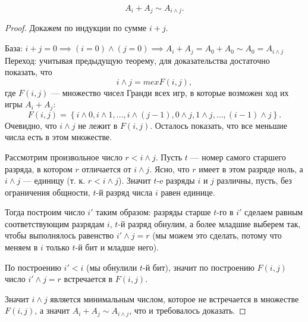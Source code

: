 \begin{theorem}
  \[
  A_{i} + A_{j} \sim A_{i \wedge j}
  .\]  
\end{theorem}
\begin{proof}
  Докажем по индукции по сумме $i + j$.

  База: $i + j = 0 \implies (i = 0) \wedge (j = 0) \implies A_{i} + A_{j} = A_0 + A_0 \sim A_0 = A_{i \wedge j}$
  Переход: учитывая предыдущую теорему, для доказательства достаточно показать, что
  \[
    i \wedge j = mex F(i, j)
  ,\] 
  где $F(i, j)$ --- множество чисел Гранди всех игр, в которые возможен ход их игры $A_{i} + A_{j}$:
  \[
    F(i, j) = \left\{ i \wedge 0, i \wedge 1, \ldots, i \wedge (j-1), 0 \wedge j, 1 \wedge j, \ldots, (i - 1) \wedge j \right\} 
  .\] 
  Очевидно, что $i \wedge j$ не лежит в $F(i, j)$. Осталось показать, что все меньшие числа есть в этом 
  множестве.

  Рассмотрим произвольное число $r < i \wedge j$. Пусть $t$ --- номер самого старшего разряда, в котором
  $r$ отличается от $i \wedge j$. Ясно, что $r$ имеет в этом разряде ноль, а $i \wedge j$ --- единицу 
  (т. к. $r < i \wedge j$). Значит $t$-e разряды $i$ и $j$ различны, пусть, без ограничения общности, 
  $t$-й разряд числа $i$ равен единице. 

  Тогда построим число $i'$ таким образом: разряды старше $t$-го в $i'$ сделаем равным соответствующим
  разрядам $i$, $t$-й разряд обнулим, а более младшие выберем так, чтобы выполнялось равенство 
  $i' \wedge j = r$ (мы можем это сделать, потому что меняем в  $i$ только $t$-й бит и младше него).
  
  По построению $i' < i$ (мы обнулили  $t$-й бит), значит по построению  $F(i, j)$ число  $i' \wedge j = r$
  встречается в  $F(i, j)$.

  Значит  $i \wedge j$ является минимальным числом, которое не встречается в множестве $F(i, j)$, а значит
   $A_{i} + A_{j} \sim A_{i \wedge j}$, что и требовалось доказать.
\end{proof}













